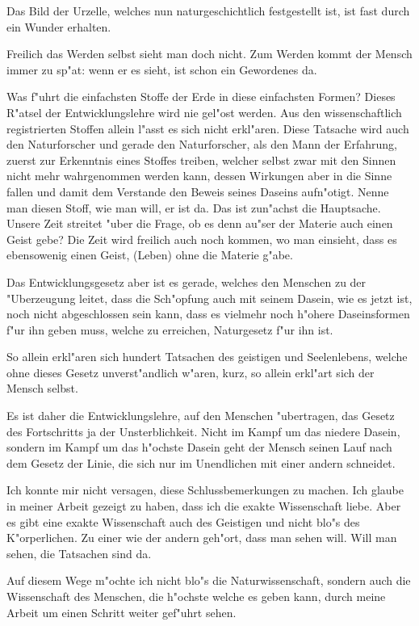 \documentclass[a4paper, 11pt, oneside, german]{article}
\begin{document}
Das Bild der Urzelle, welches nun naturgeschichtlich festgestellt ist, ist fast durch ein Wunder erhalten.

Freilich das Werden selbst sieht man doch nicht. Zum Werden kommt der Mensch immer zu sp"at: wenn er es sieht, ist schon ein Gewordenes da.

Was f"uhrt die einfachsten Stoffe der Erde in diese einfachsten Formen? Dieses R"atsel der Entwicklungslehre wird nie gel"ost werden. Aus den wissenschaftlich registrierten Stoffen allein l"asst es sich nicht erkl"aren. Diese Tatsache wird auch den Naturforscher und gerade den Naturforscher, als den Mann der Erfahrung, zuerst zur Erkenntnis eines Stoffes treiben, welcher selbst zwar mit den Sinnen nicht mehr wahrgenommen werden kann, dessen Wirkungen aber in die Sinne fallen und damit dem Verstande den Beweis seines Daseins aufn"otigt. Nenne man diesen Stoff, wie man will, er ist da. Das ist zun"achst die Hauptsache. Unsere Zeit streitet "uber die Frage, ob es denn au"ser der Materie auch einen Geist gebe? Die Zeit wird freilich auch noch kommen, wo man einsieht, dass es ebensowenig einen Geist, (Leben) ohne die Materie g"abe.

Das Entwicklungsgesetz aber ist es gerade, welches den Menschen zu der "Uberzeugung leitet, dass die Sch"opfung auch mit seinem Dasein, wie es jetzt ist, noch nicht abgeschlossen sein kann, dass es vielmehr noch h"ohere Daseinsformen f"ur ihn geben muss, welche zu erreichen, Naturgesetz f"ur ihn ist.

So allein erkl"aren sich hundert Tatsachen des geistigen und Seelenlebens, welche ohne dieses Gesetz unverst"andlich w"aren, kurz, so allein erkl"art sich der Mensch selbst.

Es ist daher die Entwicklungslehre, auf den Menschen "ubertragen, das Gesetz des Fortschritts ja der Unsterblichkeit. Nicht im Kampf um das niedere Dasein, sondern im Kampf um das h"ochste Dasein geht der Mensch seinen Lauf nach dem Gesetz der Linie, die sich nur im Unendlichen mit einer andern schneidet.

Ich konnte mir nicht versagen, diese Schlussbemerkungen zu machen. Ich glaube in meiner Arbeit gezeigt zu haben, dass ich die exakte Wissenschaft liebe. Aber es gibt eine exakte Wissenschaft auch des Geistigen und nicht blo"s des K"orperlichen. Zu einer wie der andern geh"ort, dass man sehen will. Will man sehen, die Tatsachen sind da.

Auf diesem Wege m"ochte ich nicht blo"s die Naturwissenschaft, sondern auch die Wissenschaft des Menschen, die h"ochste welche es geben kann, durch meine Arbeit um einen Schritt weiter gef"uhrt sehen.
\clearpage
\end{document}
